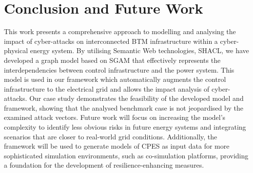 \section
{Conclusion and Future Work}

This work presents a comprehensive approach to modelling and analysing the impact of cyber-attacks on interconnected \ac{BTM} infrastructure within a cyber-physical energy system.
By utilising Semantic Web technologies, \ac{SHACL},  we have developed a graph model based on \ac{SGAM} that effectively represents the interdependencies between control infrastructure and the power system.
This model is used in our framework which automatically augments the control infrastructure to the electrical grid and allows the impact analysis of cyber-attacks.
Our case study demonstrates the feasibility of the developed model and framework, showing that the analysed benchmark case is not jeopardised by the examined attack vectors.
Future work will focus on increasing the model's complexity to identify less obvious risks in future energy systems and integrating scenarios that are closer to real-world grid conditions.
Additionally, the framework will be used to generate models of \ac{CPES} as input data for more sophisticated simulation environments, such as co-simulation platforms, providing a foundation for the development of resilience-enhancing measures.